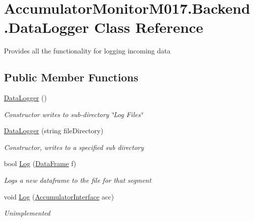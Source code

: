 \hypertarget{class_accumulator_monitor_m017_1_1_backend_1_1_data_logger}{}\section{Accumulator\+Monitor\+M017.\+Backend.\+Data\+Logger Class Reference}
\label{class_accumulator_monitor_m017_1_1_backend_1_1_data_logger}


Provides all the functionality for logging incoming data  


\subsection*{Public Member Functions}
\begin{DoxyCompactItemize}
\item 
\hyperlink{class_accumulator_monitor_m017_1_1_backend_1_1_data_logger_a026272b9f65aab6746069e21fe19bdb8}{Data\+Logger} ()
\begin{DoxyCompactList}\small\item\em Constructor writes to sub-\/directory \char`\"{}\+Log Files\char`\"{} \end{DoxyCompactList}\item 
\hyperlink{class_accumulator_monitor_m017_1_1_backend_1_1_data_logger_a45a371b2221ba298180c1d4227d6430f}{Data\+Logger} (string file\+Directory)
\begin{DoxyCompactList}\small\item\em Constructor, writes to a specified sub directory \end{DoxyCompactList}\item 
bool \hyperlink{class_accumulator_monitor_m017_1_1_backend_1_1_data_logger_afe27258422ed9f9071dfa8b5633a15e3}{Log} (\hyperlink{class_accumulator_monitor_m017_1_1_backend_1_1_data_frame}{Data\+Frame} f)
\begin{DoxyCompactList}\small\item\em Logs a new dataframe to the file for that segment \end{DoxyCompactList}\item 
void \hyperlink{class_accumulator_monitor_m017_1_1_backend_1_1_data_logger_ad444afa75855d8cff7deaed95d7bb5b2}{Log} (\hyperlink{class_accumulator_monitor_m017_1_1_backend_1_1_accumulator_interface}{Accumulator\+Interface} acc)
\begin{DoxyCompactList}\small\item\em Unimplemented \end{DoxyCompactList}\end{DoxyCompactItemize}


